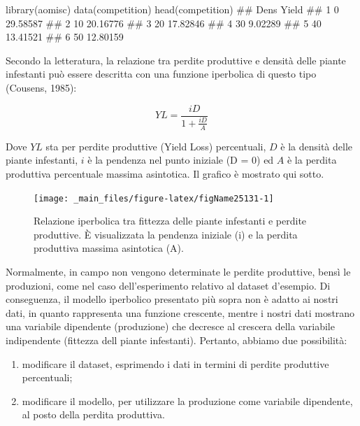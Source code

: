\documentclass[a4paper,12pt,oneside]{book}
\providecommand{\tightlist}{%
  \setlength{\itemsep}{0pt}\setlength{\parskip}{0pt}}
\newenvironment{Shaded}{\begin{snugshade}}{\end{snugshade}}
\newcommand{\DocumentationTok}[1]{#1}
\newcommand{\FunctionTok}[1]{#1}
\newcommand{\NormalTok}[1]{#1}
\begin{document}
\begin{Shaded}
\begin{Highlighting}[]
\FunctionTok{library}\NormalTok{(aomisc)}
\FunctionTok{data}\NormalTok{(competition)}
\FunctionTok{head}\NormalTok{(competition)}
\DocumentationTok{\#\#   Dens    Yield}
\DocumentationTok{\#\# 1    0 29.58587}
\DocumentationTok{\#\# 2   10 20.16776}
\DocumentationTok{\#\# 3   20 17.82846}
\DocumentationTok{\#\# 4   30  9.02289}
\DocumentationTok{\#\# 5   40 13.41521}
\DocumentationTok{\#\# 6   50 12.80159}
\end{Highlighting}
\end{Shaded}

Secondo la letteratura, la relazione tra perdite produttive e densità delle piante infestanti può essere descritta con una funzione iperbolica di questo tipo (Cousens, 1985):

\[YL = \frac{iD}{1 + \frac{iD}{A}}\]

Dove \(YL\) sta per perdite produttive (Yield Loss) percentuali, \(D\) è la densità delle piante infestanti, \(i\) è la pendenza nel punto iniziale (D = 0) ed \(A\) è la perdita produttiva percentuale massima asintotica. Il grafico è mostrato qui sotto.

\begin{figure}

{\centering \texttt{[image: \_main\_files/figure-latex/figName25131-1]} 

}

\caption{Relazione iperbolica tra fittezza delle piante infestanti e perdite produttive. È  visualizzata la pendenza iniziale (i) e la perdita produttiva massima asintotica (A).}\label{fig:figName25131}
\end{figure}

Normalmente, in campo non vengono determinate le perdite produttive, bensì le produzioni, come nel caso dell'esperimento relativo al dataset d'esempio. Di conseguenza, il modello iperbolico presentato più sopra non è adatto ai nostri dati, in quanto rappresenta una funzione crescente, mentre i nostri dati mostrano una variabile dipendente (produzione) che decresce al crescera della variabile indipendente (fittezza dell piante infestanti). Pertanto, abbiamo due possibilità:

\begin{enumerate}
\def\labelenumi{\arabic{enumi}.}
\tightlist
\item
  modificare il dataset, esprimendo i dati in termini di perdite produttive percentuali;
\item
  modificare il modello, per utilizzare la produzione come variabile dipendente, al posto della perdita produttiva.
\end{enumerate}
\end{document}
